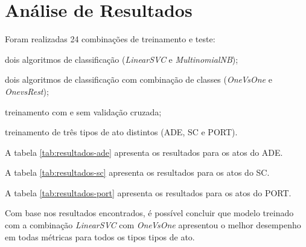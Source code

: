 \section{Análise de Resultados}

Foram realizadas 24 combinações de treinamento e teste:

\begin{alineas}
\item dois algoritmos de classificação (\textit{LinearSVC} e \textit{MultinomialNB});
\item dois algoritmos de classificação com combinação de classes (\textit{OneVsOne} e \textit{OnevsRest});
\item treinamento com e sem validação cruzada;
\item treinamento de três tipos de ato distintos (ADE, SC e PORT).
\end{alineas}

A tabela \ref{tab:resultados-ade} apresenta os resultados para os atos do ADE.

A tabela \ref{tab:resultados-sc} apresenta os resultados para os atos do SC.

A tabela \ref{tab:resultados-port} apresenta os resultados para os atos do PORT.

Com base nos resultados encontrados, é possível concluir que modelo treinado com a combinação \textit{LinearSVC} com \textit{OneVsOne} apresentou o melhor desempenho em todas métricas para todos os tipos tipos de ato.